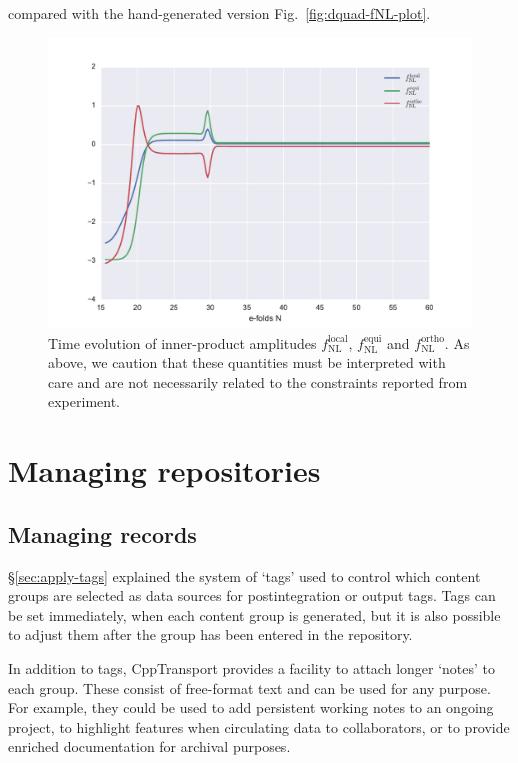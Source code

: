 \documentclass[11pt,a4paper]{article}
\newcommand{\fNL}{f_{\mathrm{NL}}}
\newcommand{\fNLlocal}{\fNL^{\text{local}}}
\newcommand{\fNLortho}{\fNL^{\text{ortho}}}
\newcommand{\fNLequi}{\fNL^{\text{equi}}}
\newcommand{\packagefont}{\sffamily}
\newcommand{\CppTransport}{{\packagefont CppTransport}}
\begin{document}
compared with the hand-generated version Fig.~\ref{fig:dquad-fNL-plot}.
\begin{figure}
    \begin{center}
        \includegraphics[scale=0.75]{Outputs/fNL_plot}
    \end{center}
    \caption{\label{fig:fNL-auto-plot}Time evolution of
    inner-product amplitudes
    $\fNLlocal$, $\fNLequi$ and $\fNLortho$.
    As above, we caution that these quantities must be interpreted with
    care and are not necessarily related to the constraints reported
    from experiment.}
\end{figure}

\section{Managing repositories}
\label{sec:repo-management}

\subsection{Managing records}
\S\ref{sec:apply-tags} explained the system of `tags' used to control which
content groups are selected as data sources
for postintegration or output tags.
Tags can be set immediately, when each content group is generated,
but it is also possible to adjust them after
the group has been entered in the repository.

In addition to tags, {\CppTransport} provides a facility to attach
longer `notes' to each group.
These consist of free-format text and can be used for any purpose.
For example, they could be used to add persistent working notes
to an ongoing project,
to highlight features when circulating data to collaborators,
or to provide enriched documentation for archival purposes.
\end{document}
